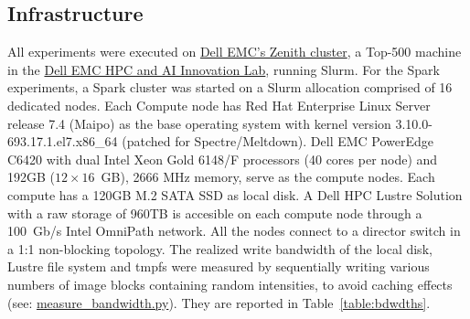 \documentclass{IEEEtran}
\newcommand{\todo}[1]{\marginpar{\parbox{18mm}{\flushleft\tiny\color{red}\textbf{TODO}:
      #1}}}
\begin{document}





\subsection{Infrastructure} %

 All experiments were executed on 
 \href{https://www.dellemc.com/resources/en-us/asset/sales-documents/products/storage/h16221-hpc-lab-brochure.pdf}{Dell 
 EMC's Zenith cluster}, a Top-500 machine in the 
 \href{https://www.dellemc.com/en-us/solutions/high-performance-computing/HPC-AI-Innovation-Lab.htm}{Dell 
 EMC HPC and AI Innovation Lab}, running Slurm. For the Spark 
 experiments, a Spark cluster was started on a
 Slurm allocation comprised of 16 dedicated nodes.
 Each Compute node has Red Hat Enterprise Linux Server release 7.4 (Maipo) 
 as the base operating system with kernel version 3.10.0-693.17.1.el7.x86\_64
 (patched for Spectre/Meltdown). Dell EMC PowerEdge C6420 with dual Intel Xeon
 Gold 6148/F processors (40 cores per node) and 192GB ($12\times16$~GB), 2666 MHz
 memory, serve as the compute nodes. Each compute has a 120GB M.2 SATA SSD as 
 local disk. A Dell HPC Lustre Solution with a raw storage of 960TB is 
 accesible on each compute node through a 100~Gb/s Intel OmniPath network. All
 the nodes connect to a director switch in a 1:1 non-blocking topology.
 The realized write bandwidth of the local disk, 
 Lustre file system and tmpfs were measured by sequentially writing various numbers
 of image blocks containing random intensities, to avoid 
 caching effects (see: \href{https://github.com/big-data-lab-team/paper-in-mem-locality/blob/master/benchmark_scripts/measure_bandwidth.py}{measure\_bandwidth.py}).
 They are reported in Table~\ref{table:bdwdths}.
\end{document}
